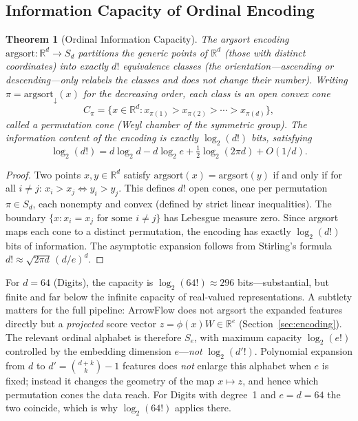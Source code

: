 \documentclass[12pt]{article}
\newcommand{\R}{\mathbb{R}}
\newcommand{\argsort}{\mathrm{argsort}}
\newcommand{\orderdesc}{\mathrm{argsort}_{\downarrow}}
\newtheorem{theorem}{Theorem}
\begin{document}
\subsection{Information Capacity of Ordinal Encoding}

\begin{theorem}[Ordinal Information Capacity]
\label{thm:capacity}
The argsort encoding $\argsort\colon \R^d \to S_d$ partitions the generic points of $\R^d$ (those with distinct coordinates) into exactly $d!$ equivalence classes (the orientation---ascending or descending---only relabels the classes and does not change their number). Writing $\pi=\orderdesc(x)$ for the decreasing order, each class is an open convex cone
\[
C_\pi = \big\{x \in \R^d : x_{\pi(1)} > x_{\pi(2)} > \cdots > x_{\pi(d)}\big\},
\]
called a \emph{permutation cone} (Weyl chamber of the symmetric group). The information content of the encoding is exactly $\log_2(d!)$ bits, satisfying
\begin{equation}
\label{eq:capacity}
\log_2(d!) = d\log_2 d - d\log_2 e + \tfrac{1}{2}\log_2(2\pi d) + O(1/d).
\end{equation}
\end{theorem}

\begin{proof}
Two points $x, y \in \R^d$ satisfy $\argsort(x) = \argsort(y)$ if and only if for all $i \neq j$: $x_i > x_j \Leftrightarrow y_i > y_j$. This defines $d!$ open cones, one per permutation $\pi \in S_d$, each nonempty and convex (defined by strict linear inequalities). The boundary $\{x : x_i = x_j \text{ for some } i \neq j\}$ has Lebesgue measure zero. Since argsort maps each cone to a distinct permutation, the encoding has exactly $\log_2(d!)$ bits of information. The asymptotic expansion follows from Stirling's formula $d! \approx \sqrt{2\pi d}\,(d/e)^d$.
\end{proof}

For $d = 64$ (Digits), the capacity is $\log_2(64!) \approx 296$ bits---substantial, but finite and far below the infinite capacity of real-valued representations. A subtlety matters for the full pipeline: ArrowFlow does not argsort the expanded features directly but a \emph{projected} score vector $z = \phi(x)W \in \R^e$ (Section~\ref{sec:encoding}). The relevant ordinal alphabet is therefore $S_e$, with maximum capacity $\log_2(e!)$ controlled by the embedding dimension $e$---\emph{not} $\log_2(d'!)$. Polynomial expansion from $d$ to $d' = \binom{d+k}{k}-1$ features does \emph{not} enlarge this alphabet when $e$ is fixed; instead it changes the geometry of the map $x \mapsto z$, and hence which permutation cones the data reach. For Digits with degree~1 and $e = d = 64$ the two coincide, which is why $\log_2(64!)$ applies there.
\end{document}
